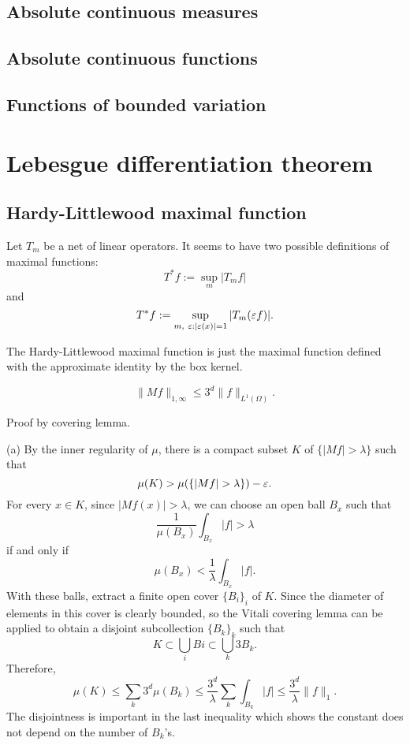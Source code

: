 \documentclass{../../large}
\begin{document}
\section{Absolute continuous measures}

\section{Absolute continuous functions}

\section{Functions of bounded variation}




\chapter{Lebesgue differentiation theorem}

\section{Hardy-Littlewood maximal function}

Let $T_m$ be a net of linear operators.
It seems to have two possible definitions of maximal functions:
\[T^*f:=\sup_m|T_mf|\]
and
\[T^*f:=\sup_{m,\ \varepsilon:|\varepsilon(x)|=1}|T_m(\varepsilon f)|.\]

\begin{prb}
The Hardy-Littlewood maximal function is just the maximal function defined with the approximate identity by the box kernel.
\end{prb}

\begin{prb}
\[\|Mf\|_{1,\infty}\le 3^d\|f\|_{L^1(\Omega)}.\]
\begin{parts}
\item Proof by covering lemma.
\end{parts}
\end{prb}
\begin{pf}
(a)
By the inner regularity of $\mu$, there is a compact subset $K$ of $\{|Mf|>\lambda\}$ such that
\[\mu(K)>\mu(\{|Mf|>\lambda\})-\e.\]
For every $x\in K$, since $|Mf(x)|>\lambda$, we can choose an open ball $B_x$ such that
\[\frac1{\mu(B_x)}\int_{B_x}|f|>\lambda\]
if and only if
\[\mu(B_x)<\frac1\lambda\int_{B_x}|f|.\]
With these balls, extract a finite open cover $\{B_i\}_i$ of $K$.
Since the diameter of elements in this cover is clearly bounded, so the Vitali covering lemma can be applied to obtain a disjoint subcollection $\{B_k\}_k$ such that
\[K\subset\bigcup_iBi\subset\bigcup_k3B_k.\]
Therefore,
\[\mu(K)
\le\sum_k3^d\mu(B_k)
\le\frac{3^d}\lambda\sum_k\int_{B_k}|f|
\le\frac{3^d}\lambda\|f\|_1.\]
The disjointness is important in the last inequality which shows the constant does not depend on the number of $B_k$'s.
\end{pf}
\end{document}
